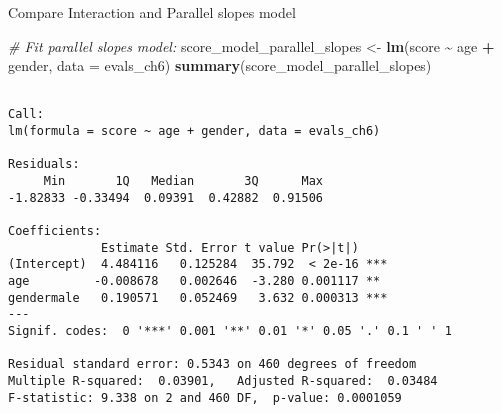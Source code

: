 \documentclass[
  ignorenonframetext,
]{beamer}
\newenvironment{Shaded}{\begin{snugshade}}{\end{snugshade}}
\newcommand{\AttributeTok}[1]{\textcolor[rgb]{0.13,0.29,0.53}{#1}}
\newcommand{\CommentTok}[1]{\textcolor[rgb]{0.56,0.35,0.01}{\textit{#1}}}
\newcommand{\FunctionTok}[1]{\textcolor[rgb]{0.13,0.29,0.53}{\textbf{#1}}}
\newcommand{\NormalTok}[1]{#1}
\newcommand{\OtherTok}[1]{\textcolor[rgb]{0.56,0.35,0.01}{#1}}
\newcommand{\SpecialCharTok}[1]{\textcolor[rgb]{0.81,0.36,0.00}{\textbf{#1}}}
\begin{document}
\begin{frame}[fragile]{Compare Interaction and Parallel slopes model}
\protect\hypertarget{compare-interaction-and-parallel-slopes-model-1}{}
\scriptsize

\begin{Shaded}
\begin{Highlighting}[]
\CommentTok{\# Fit parallel slopes model:}
\NormalTok{score\_model\_parallel\_slopes }\OtherTok{\textless{}{-}} \FunctionTok{lm}\NormalTok{(score }\SpecialCharTok{\textasciitilde{}}\NormalTok{ age }\SpecialCharTok{+}\NormalTok{ gender, }\AttributeTok{data =}\NormalTok{ evals\_ch6)}
\FunctionTok{summary}\NormalTok{(score\_model\_parallel\_slopes)}
\end{Highlighting}
\end{Shaded}

\begin{verbatim}

Call:
lm(formula = score ~ age + gender, data = evals_ch6)

Residuals:
     Min       1Q   Median       3Q      Max 
-1.82833 -0.33494  0.09391  0.42882  0.91506 

Coefficients:
             Estimate Std. Error t value Pr(>|t|)    
(Intercept)  4.484116   0.125284  35.792  < 2e-16 ***
age         -0.008678   0.002646  -3.280 0.001117 ** 
gendermale   0.190571   0.052469   3.632 0.000313 ***
---
Signif. codes:  0 '***' 0.001 '**' 0.01 '*' 0.05 '.' 0.1 ' ' 1

Residual standard error: 0.5343 on 460 degrees of freedom
Multiple R-squared:  0.03901,   Adjusted R-squared:  0.03484 
F-statistic: 9.338 on 2 and 460 DF,  p-value: 0.0001059
\end{verbatim}

\normalsize
\end{frame}
\end{document}
